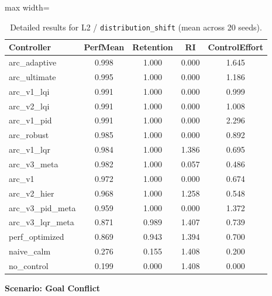 \documentclass{article}
\newcommand{\scenarioheader}[1]{\Needspace{20\baselineskip}\textbf{Scenario: #1}}
\begin{document}
\begin{table}[H]
\centering
\footnotesize
\caption{Detailed results for L2 / \texttt{distribution\_shift} (mean across 20 seeds).}
\label{tab:g4_distribution_shift}
\begin{adjustbox}{max width=\textwidth}
\begin{tabular}{@{}lcccc@{}}
\toprule
Controller & PerfMean & Retention & RI & ControlEffort \\ \midrule
arc\_adaptive & 0.998 & 1.000 & 0.000 & 1.645 \\
arc\_ultimate & 0.995 & 1.000 & 0.000 & 1.186 \\
arc\_v1\_lqi & 0.991 & 1.000 & 0.000 & 0.999 \\
arc\_v2\_lqi & 0.991 & 1.000 & 0.000 & 1.008 \\
arc\_v1\_pid & 0.991 & 1.000 & 0.000 & 2.296 \\
arc\_robust & 0.985 & 1.000 & 0.000 & 0.892 \\
arc\_v1\_lqr & 0.984 & 1.000 & 1.386 & 0.695 \\
arc\_v3\_meta & 0.982 & 1.000 & 0.057 & 0.486 \\
arc\_v1 & 0.972 & 1.000 & 0.000 & 0.674 \\
arc\_v2\_hier & 0.968 & 1.000 & 1.258 & 0.548 \\
arc\_v3\_pid\_meta & 0.959 & 1.000 & 0.000 & 1.372 \\
arc\_v3\_lqr\_meta & 0.871 & 0.989 & 1.407 & 0.739 \\
perf\_optimized & 0.869 & 0.943 & 1.394 & 0.700 \\
naive\_calm & 0.276 & 0.155 & 1.408 & 0.200 \\
no\_control & 0.199 & 0.000 & 1.408 & 0.000 \\ \bottomrule
\end{tabular}
\end{adjustbox}
\end{table}

\scenarioheader{Goal Conflict}
\end{document}
